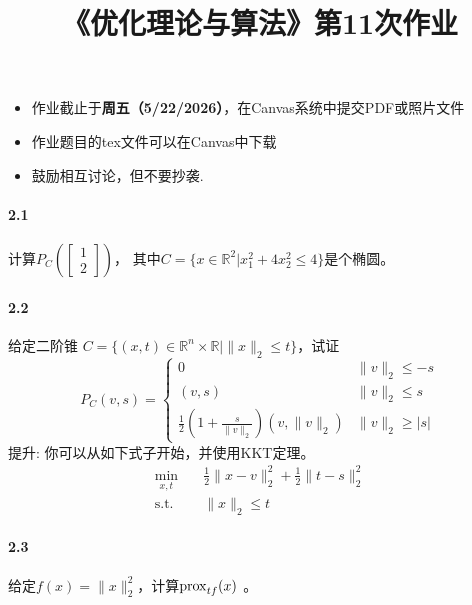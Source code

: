 \documentclass[12pt,a4paper]{article}
\begin{document}
\title{
{《优化理论与算法》第11次作业
}
}
\date{}


\maketitle
\begin{itemize}
	\item 作业截止于{\bf 周五（5/22/2026）}，在Canvas系统中提交PDF或照片文件
	\item 作业题目的tex文件可以在Canvas中下载
	\item 鼓励相互讨论，但不要抄袭.
\end{itemize}

\paragraph{2.1} 计算$P_C\left(\begin{bmatrix}
1 \\
2
\end{bmatrix}\right)$， 其中$C=\{x \in \mathbb{R}^2|x_1^2+4x_2^2 \leq 4 \}$是个椭圆。

\paragraph{2.2}给定二阶锥 $C=\{(x,t)\in \mathbb R^n\times \mathbb{R}\mid\|x\|_2\le t\}$，试证
$$P_C(v,s)=\left\{\begin{array}{ll}0&\|v\|_2\le-s\\
(v,s)&\|v\|_2\le s\\
\frac{1}{2}(1+\frac{s}{\|v\|_2})(v,\|v\|_2)&\|v\|_2\ge|s|
\end{array}\right. $$
提升: 你可以从如下式子开始，并使用KKT定理。
\begin{align*}
\min_{x,t}\quad & \frac{1}{2} \|x-v\|^2_2+\frac{1}{2} \|t-s\|^2_2 \\
\text{s.t.} \quad & \|x\|_2\leq t
\end{align*}

\paragraph{2.3} 给定$f(x)=\|x\|_2^2$，计算${\rm prox}_{tf}(x)$ 。
\end{document}
